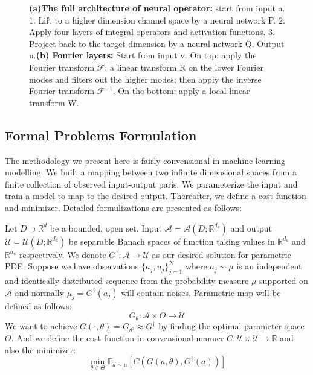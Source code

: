 \documentclass[conference]{IEEEtran}
\begin{document}
\begin{figure*}[htbp]
\caption{ \textbf{(a)The full architecture of neural operator:} start from input a. 1. Lift to a higher dimension channel space by a neural network P. 2. Apply four layers of integral operators and activation functions. 3. Project back to the target dimension by a neural network Q. Output u.\textbf{(b) Fourier layers:} Start from input v. On top: apply the Fourier transform $\mathcal{F}$; a linear transform R on the lower Fourier modes and filters out the higher modes; then apply the inverse Fourier transform $\mathcal{F}^{-1}$. On the bottom: apply a local linear transform W.}
\label{fig}
\end{figure*}

\subsection{Formal Problems Formulation}
The methodology we present here is fairly convensional in machine learning modelling. We
built a mapping between two infinite dimensional spaces from a finite collection of observed input-output paris. We parameterize the input and train a model to map to the desired output. Thereafter, we define a cost function and minimizer. Detailed formulizations are presented as follows:

Let $D \supset \mathbb{R}^{d}$ be a bounded, open set. Input $\mathcal{A}= \mathcal{A}\left( D;\mathbb{R}^{d_{a}} \right)$ and output $\mathcal{U}= \mathcal{U}\left( D;\mathbb{R}^{d_{u}} \right)$ be separable Banach spaces of function taking values in $\mathbb{R}^{d_{a}}$ and $\mathbb{R}^{d_{u}}$ respectively. We denote $G^{\dagger}:\mathcal{A} \rightarrow \mathcal{U}$ as our desired solution for parametric PDE. Suppose we have observations $\{ a_{j},u_{j} \}_{j=1}^{N} $ where $a_{j} \sim \mu$ is an independent and identically distributed sequence from the probability measure $\mu$ supported on $\mathcal{A}$ and normally $\mu_{j} = G^{\dagger} \left( a_{j} \right)$ will contain noises. Parametric map will be defined as follows:
\begin{equation}
G_{\theta}:\mathcal{A} \times \Theta \rightarrow \mathcal{U} \label{eq}
\end{equation}
We want to achieve $G \left( \cdot, \theta \right) = G_{\theta^{\dagger}} \approx G^{\dagger} $ by finding the optimal parameter space $\Theta$. And we define the cost function in convensional manner $C:\mathcal{U \times \mathcal{U} \rightarrow \mathbb{R}}$ and also the minimizer:
\begin{equation}
\min_{\theta \in \Theta} \mathbb{E}_{a \sim \mu} [ C \left( G \left( a, \theta \right) , G^{\dagger} \left( a \right) \right) ]  
\label{eq}
\end{equation}
\end{document}
